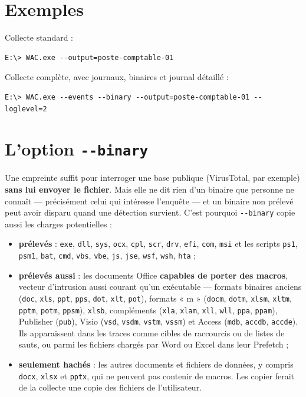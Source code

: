 \documentclass[11pt,a4paper,oneside]{report}
\newcommand{\opt}[1]{\texttt{-{}-#1}}
\newcommand{\fichier}[1]{\texttt{#1}}
\begin{document}
\section{Exemples}

Collecte standard :
\begin{lstlisting}
E:\> WAC.exe --output=poste-comptable-01
\end{lstlisting}

Collecte complète, avec journaux, binaires et journal détaillé :
\begin{lstlisting}
E:\> WAC.exe --events --binary --output=poste-comptable-01 --loglevel=2
\end{lstlisting}

\section{L'option \opt{binary}}\label{sec:binary}

Une empreinte suffit pour interroger une base publique (VirusTotal, par exemple)
\textbf{sans lui envoyer le fichier}. Mais elle ne dit rien d'un binaire que
personne ne connaît — précisément celui qui intéresse l'enquête — et un binaire
non prélevé peut avoir disparu quand une détection survient. C'est pourquoi
\opt{binary} copie aussi les charges potentielles :

\begin{itemize}
  \item \textbf{prélevés} : \fichier{exe}, \fichier{dll}, \fichier{sys},
        \fichier{ocx}, \fichier{cpl}, \fichier{scr}, \fichier{drv},
        \fichier{efi}, \fichier{com}, \fichier{msi} et les scripts
        \fichier{ps1}, \fichier{psm1}, \fichier{bat}, \fichier{cmd},
        \fichier{vbs}, \fichier{vbe}, \fichier{js}, \fichier{jse},
        \fichier{wsf}, \fichier{wsh}, \fichier{hta} ;
  \item \textbf{prélevés aussi} : les documents Office \textbf{capables de porter
        des macros}, vecteur d'intrusion aussi courant qu'un exécutable —
        formats binaires anciens (\fichier{doc}, \fichier{xls}, \fichier{ppt},
        \fichier{pps}, \fichier{dot}, \fichier{xlt}, \fichier{pot}), formats
        « m » (\fichier{docm}, \fichier{dotm}, \fichier{xlsm}, \fichier{xltm},
        \fichier{pptm}, \fichier{potm}, \fichier{ppsm}), \fichier{xlsb},
        compléments (\fichier{xla}, \fichier{xlam}, \fichier{xll},
        \fichier{wll}, \fichier{ppa}, \fichier{ppam}), Publisher
        (\fichier{pub}), Visio (\fichier{vsd}, \fichier{vsdm}, \fichier{vstm},
        \fichier{vssm}) et Access (\fichier{mdb}, \fichier{accdb},
        \fichier{accde}). Ils apparaissent dans les traces comme cibles de
        raccourcis ou de listes de sauts, ou parmi les fichiers chargés par
        Word ou Excel dans leur Prefetch ;
  \item \textbf{seulement hachés} : les autres documents et fichiers de données,
        y compris \fichier{docx}, \fichier{xlsx} et \fichier{pptx}, qui ne
        peuvent pas contenir de macros. Les copier ferait de la collecte une
        copie des fichiers de l'utilisateur.
\end{itemize}
\end{document}
